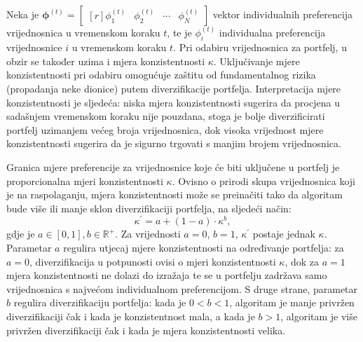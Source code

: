 \documentclass[lmodern, utf8, diplomski, numeric]{fer}
\newcommand{\matr}[1]{\mathbold{#1}}
\newcommand{\q}{\left}
\newcommand{\w}{\right}
\begin{document}
  Neka je $\matr{\phi}^{\q(t\w)} = \begin{bmatrix*}[r] \phi_1^{\q(t\w)} & \phi_2^{\q(t\w)} & \cdots & \phi_N^{\q(t\w)} \end{bmatrix*}$ vektor individualnih preferencija vrijednosnica u vremenskom koraku $t$, te je $\phi_i^{\q(t\w)}$ individualna preferencija vrijednosnice $i$ u vremenskom koraku $t$.
  Pri odabiru vrijednosnica za portfelj, u obzir se također uzima i mjera konzistentnosti $\kappa$.
  Uključivanje mjere konzistentnosti pri odabiru omogućuje zaštitu od fundamentalnog rizika (propadanja neke dionice) putem diverzifikacije portfelja.
  Interpretacija mjere konzistentnosti je sljedeća: niska mjera konzistentnosti sugerira da procjena u sadašnjem vremenskom koraku nije pouzdana, stoga je bolje diverzificirati portfelj uzimanjem većeg broja vrijednosnica, dok visoka vrijednost mjere konzistentnosti sugerira da je sigurno trgovati s manjim brojem vrijednosnica.
    
  Granica mjere preferencije za vrijednosnice koje će biti uključene u portfelj je proporcionalna mjeri konzistentnosti $\kappa$.
  Ovisno o prirodi skupa vrijednosnica koji je na raspolaganju, mjera konzistentnosti može se preinačiti tako da algoritam bude više ili manje sklon diverzifikaciji portfelja, na sljedeći način:
  \begin{equation}
  \kappa^\prime = a + (1 - a)\cdot \kappa^b,
  \end{equation}
  gdje je $a \in [0, 1], b \in \mathbb{R}^+$.
  Za vrijednosti $a = 0$, $b = 1$, $\kappa^\prime$ postaje jednak $\kappa$.
  Parametar $a$ regulira utjecaj mjere konzistentnosti na određivanje portfelja: za $a = 0$, diverzifikacija u potpunosti ovisi o mjeri konzistentnosti $\kappa$, dok za $a = 1$ mjera konzistentnosti ne dolazi do izražaja te se u portfelju zadržava samo vrijednosnica s najvećom individualnom preferencijom.
  S druge strane, parametar $b$ regulira diverzifikaciju portfelja: kada je $0 < b < 1$, algoritam je manje privržen diverzifikaciji čak i kada je konzistentnost mala, a kada je $b > 1$, algoritam je više privržen diverzifikaciji čak i kada je mjera konzistentnosti velika.
  
\end{document}
